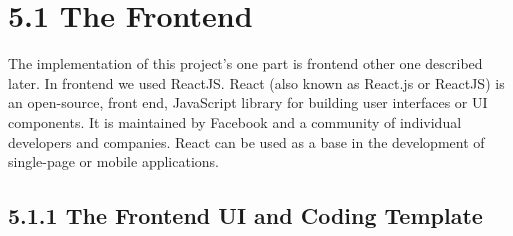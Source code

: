 \documentclass{standalone}
\begin{document}
\section*{5.1\hspace{0.3 cm} The Frontend}
 \vspace{0.3cm}

\hspace{0.5cm} The implementation of this project's one part is frontend other one described later. In frontend we used ReactJS. React (also known as React.js or ReactJS) is an open-source, front end, JavaScript library for building user interfaces or UI components. It is maintained by Facebook and a community of individual developers and companies.  React can be used as a base in the development of single-page or mobile applications.\vspace{1cm}

\subsection*{5.1.1\hspace{0.3 cm} The Frontend UI and Coding Template}
 \vspace{0.3cm}

\newpage
\vfill
\end{document}
